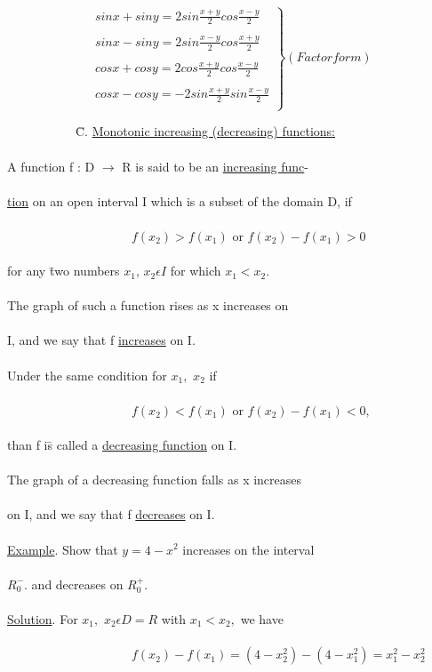 \documentclass[11pt]{amsbook}
\begin{document}
\[ \left. \begin{array}{ll}
sinx+siny=2sin\frac{x+y}{2}cos\frac{x-y}{2}\\

\\
sinx-siny=2sin\frac{x-y}{2}cos\frac{x+y}{2}\\

\\
cosx+cosy=2cos\frac{x+y}{2}cos\frac{x-y}{2}\\

\\
cosx-cosy=-2sin\frac{x+y}{2}sin\frac{x-y}{2}\\
\end{array} \right  \}   (Factor form) 
\] 
\begin{tabbing}
\ \ \ \ \ \ \ \ \ \ \
\=C. \underline{Monotonic increasing (decreasing) functions:}\\
\\
\>A function f : D $\rightarrow$ R is said to be an \underline{increasing func}- \\
\\
\underline{tion} on an open  interval I which is a subset of the domain D, if\\
\\
\ \ \ \ \ \ \ \ \ \ \ \ \ \ \ \ \ \ \ \
$f(x_{2})>f(x_{1})$ or $f(x_{2})-f(x_{1})>0$\\
\\
for any \= two numbers $x_{1}$, $x_{2}\epsilon I$ for which $x_{1}<x_{2}$.\\
\\
\>The graph of such a function rises as x increases on \\
\\
I, and we say that f \underline{increases} on I.\\
\\
\>Under the same condition for $x_{1},$ $x_{2}$ if\\
\\
\ \ \ \ \ \ \ \ \ \ \ \ \ \ \ \ \ \ \ \ 
$f(x_{2})<f(x_{1})$ or $f(x_{2})-f(x_{1})<0,$\\
\\
than f i\=s called a \underline{decreasing function} on I.\\
\\
\>The graph of a decreasing function falls as x increases\\
\\
on I, and we say that f \underline{decreases} on I.\\
\\
\>\underline{Example}. Show that $y = 4 - x^{2}$ increases on the interval\\
\\
$R_{0}^{-}$. and decreases on  $R_{0}^{+}.$\\
\\
\>\underline{Solution}. For $x_{1},$ $x_{2}\epsilon D = R$ with $x_{1}<x_{2},$ we have\\
\\
\ \ \ \ \ \ \ \ \ \ \ \ \ \ \ \ \ \ \ \ 
$f(x_{2})-f(x_{1}) = (4 - x_{2}^{2}) - (4 - x_{1}^{2}) = x_{1}^{2} - x_{2}^{2}$\\

\end{tabbing}
\end{document}
